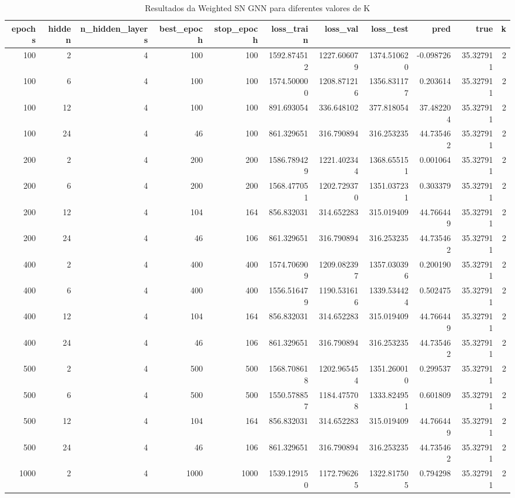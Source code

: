 \begin{table}
\caption{Resultados da Weighted SN GNN para diferentes valores de K}
\label{tab:weighted_gnn_results_all_k}
\begin{tabular}{rrrrrrrrrrr}
\toprule
epochs & hidden & n\_hidden\_layers & best\_epoch & stop\_epoch & loss\_train & loss\_val & loss\_test & pred & true & k \\
\midrule
100 & 2 & 4 & 100 & 100 & 1592.874512 & 1227.606079 & 1374.510620 & -0.098726 & 35.327911 & 2 \\
100 & 6 & 4 & 100 & 100 & 1574.500000 & 1208.871216 & 1356.831177 & 0.203614 & 35.327911 & 2 \\
100 & 12 & 4 & 100 & 100 & 891.693054 & 336.648102 & 377.818054 & 37.482204 & 35.327911 & 2 \\
100 & 24 & 4 & 46 & 100 & 861.329651 & 316.790894 & 316.253235 & 44.735462 & 35.327911 & 2 \\
200 & 2 & 4 & 200 & 200 & 1586.789429 & 1221.402344 & 1368.655151 & 0.001064 & 35.327911 & 2 \\
200 & 6 & 4 & 200 & 200 & 1568.477051 & 1202.729370 & 1351.037231 & 0.303379 & 35.327911 & 2 \\
200 & 12 & 4 & 104 & 164 & 856.832031 & 314.652283 & 315.019409 & 44.766449 & 35.327911 & 2 \\
200 & 24 & 4 & 46 & 106 & 861.329651 & 316.790894 & 316.253235 & 44.735462 & 35.327911 & 2 \\
400 & 2 & 4 & 400 & 400 & 1574.706909 & 1209.082397 & 1357.030396 & 0.200190 & 35.327911 & 2 \\
400 & 6 & 4 & 400 & 400 & 1556.516479 & 1190.531616 & 1339.534424 & 0.502475 & 35.327911 & 2 \\
400 & 12 & 4 & 104 & 164 & 856.832031 & 314.652283 & 315.019409 & 44.766449 & 35.327911 & 2 \\
400 & 24 & 4 & 46 & 106 & 861.329651 & 316.790894 & 316.253235 & 44.735462 & 35.327911 & 2 \\
500 & 2 & 4 & 500 & 500 & 1568.708618 & 1202.965454 & 1351.260010 & 0.299537 & 35.327911 & 2 \\
500 & 6 & 4 & 500 & 500 & 1550.578857 & 1184.475708 & 1333.824951 & 0.601809 & 35.327911 & 2 \\
500 & 12 & 4 & 104 & 164 & 856.832031 & 314.652283 & 315.019409 & 44.766449 & 35.327911 & 2 \\
500 & 24 & 4 & 46 & 106 & 861.329651 & 316.790894 & 316.253235 & 44.735462 & 35.327911 & 2 \\
1000 & 2 & 4 & 1000 & 1000 & 1539.129150 & 1172.796265 & 1322.817505 & 0.794298 & 35.327911 & 2 \\

\end{tabular}
\end{table}

